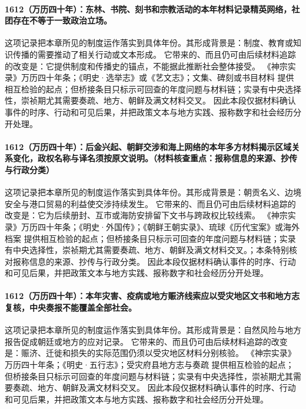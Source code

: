 \paragraph{1612（万历四十年）：东林、书院、刻书和宗教活动的本年材料记录精英网络，社团存在不等于一致政治立场。} 这项记录把本章所见的制度运作落实到具体年份。其形成背景是：制度、教育或知识传播的需要推动了相关行动或文本形成。 它带来的、而且仍可由后续材料追踪的改变是：它提供制度和传播史的锚点，不能据此推断社会整体接受。 《神宗实录》万历四十年条；《明史·选举志》或《艺文志》；文集、碑刻或书目材料 提供相互检验的起点；但桥接条目只标示可回查的年度问题与材料链；实录有中央选择性，崇祯期尤其需要奏疏、地方、朝鲜及满文材料交叉。 因此本段仅据材料确认事件的时序、行动和可见后果，并把政策文本与地方实践、报称数字和社会经历分开处理。

\paragraph{1612（万历四十年）：后金兴起、朝鲜交涉和海上网络的本年多方材料揭示区域关系变化，政权名称与译名须按原文说明。（材料核查重点：报称信息的来源、抄传与行政分类）} 这项记录把本章所见的制度运作落实到具体年份。其形成背景是：朝贡名义、边境安全与港口贸易的利益使交涉持续发生。 它带来的、而且仍可由后续材料追踪的改变是：它为后续册封、互市或海防安排留下文书与跨政权比较线索。 《神宗实录》万历四十年条；《明史·外国传》；《朝鲜王朝实录》、琉球《历代宝案》或海外档案 提供相互检验的起点；但桥接条目只标示可回查的年度问题与材料链；实录有中央选择性，崇祯期尤其需要奏疏、地方、朝鲜及满文材料交叉。；本条特别核对报称信息的来源、抄传与行政分类。 因此本段仅据材料确认事件的时序、行动和可见后果，并把政策文本与地方实践、报称数字和社会经历分开处理。

\paragraph{1612（万历四十年）：本年灾害、疫病或地方赈济线索应以受灾地区文书和地方志复核，中央奏报不能覆盖全部社会。} 这项记录把本章所见的制度运作落实到具体年份。其形成背景是：自然风险与地方报告促成朝廷或地方的应对记录。 它带来的、而且仍可由后续材料追踪的改变是：赈济、迁徙和损失的实际范围仍须以受灾地区材料分别核验。 《神宗实录》万历四十年条；《明史·五行志》；受灾府县地方志与奏疏 提供相互检验的起点；但桥接条目只标示可回查的年度问题与材料链；实录有中央选择性，崇祯期尤其需要奏疏、地方、朝鲜及满文材料交叉。 因此本段仅据材料确认事件的时序、行动和可见后果，并把政策文本与地方实践、报称数字和社会经历分开处理。


